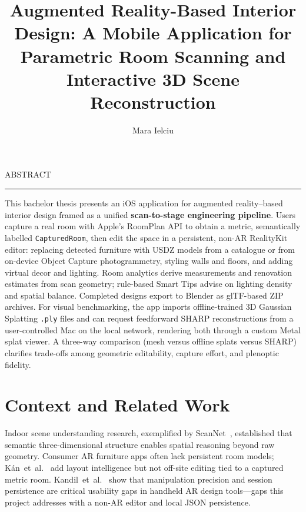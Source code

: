 \documentclass[12pt]{report}
\begin{document}
\title{Augmented Reality-Based Interior Design: A Mobile Application for Parametric Room Scanning and Interactive 3D Scene Reconstruction}
\author{Mara Ielciu}

\maketitle

\newpage
\thispagestyle{empty}
\mbox{}
\newpage
{}

\cleardoublepage
ABSTRACT
\vspace{0.5cm}
\hrule
\vspace{0.5cm}

This bachelor thesis presents an iOS application for augmented reality--based interior design framed as a unified \textbf{scan-to-stage engineering pipeline}. Users capture a real room with Apple's RoomPlan API to obtain a metric, semantically labelled \texttt{CapturedRoom}, then edit the space in a persistent, non-AR RealityKit editor: replacing detected furniture with USDZ models from a catalogue or from on-device Object Capture photogrammetry, styling walls and floors, and adding virtual decor and lighting. Room analytics derive measurements and renovation estimates from scan geometry; rule-based Smart Tips advise on lighting density and spatial balance. Completed designs export to Blender as glTF-based ZIP archives. For visual benchmarking, the app imports offline-trained 3D Gaussian Splatting \texttt{.ply} files and can request feedforward SHARP reconstructions from a user-controlled Mac on the local network, rendering both through a custom Metal splat viewer. A three-way comparison (mesh versus offline splats versus SHARP) clarifies trade-offs among geometric editability, capture effort, and plenoptic fidelity.

\tableofcontents

\newpage
{}

\section*{Context and Related Work}

Indoor scene understanding research, exemplified by ScanNet~\cite{dai2017scannet}, established that semantic three-dimensional structure enables spatial reasoning beyond raw geometry. Consumer AR furniture apps often lack persistent room models; K\'an~et~al.~\cite{kan2021ar} add layout intelligence but not off-site editing tied to a captured metric room. Kandil~et~al.~\cite{kandil2021ux} show that manipulation precision and session persistence are critical usability gaps in handheld AR design tools---gaps this project addresses with a non-AR editor and local JSON persistence.
\end{document}
